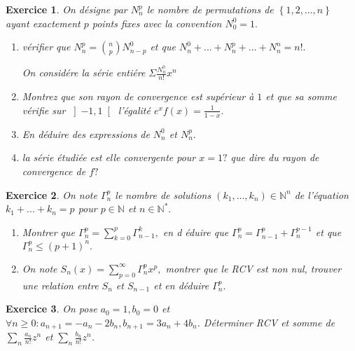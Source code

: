 \documentclass[12pt,a4paper]{article}
\theoremstyle{break}
\theoremstyle{break}
\newtheorem{Exo}{Exercice}
\begin{document}
 \begin{Exo}
 	On désigne par $N_{n}^{p}$ le nombre de permutations de $\left\{
1,2,...,n\right\} $ ayant exactement $p$ points fixes avec la convention $%
N_{0}^{0}=1.$

\begin{enumerate}
	\item vérifier que $N_{n}^{p}=\binom{n}{p}N_{n-p}^{0}$ et que $%
	N_{n}^{0}+...+N_{n}^{p}+...+N_{n}^{n}=n!.$
	
	On considére la série entiére $\Sigma \frac{N_{n}^{0}}{n!}x^{n}$
	
	\item Montrez que son rayon de convergence est supérieur \`{a} $1$ et
	que sa somme vérifie sur $\left] -1,1\right[ $ l'égalité $%
	e^{x}f(x)=\frac{1}{1-x}.$
	
	\item En déduire des expressions de $N_{n}^{0}$ et $N_{n}^{p}.$
	
	\item la série étudiée est elle convergente pour $x=1?$ que dire
	du rayon de convergence de $f?$
\end{enumerate}
 \end{Exo}

\begin{Exo}
	 On note $\Gamma _{n}^{p}$ le nombre de solutions $\left(
k_{1},...,k_{n}\right) \in \mathbb{N}^{n}$ de l'équation $%
k_{1}+...+k_{n}=p$ pour $p\in \mathbb{N}$ et $n\in \mathbb{N}^{*}.$

\begin{enumerate}
	\item Montrer que $\Gamma _{n}^{p}=\sum_{k=0}^{p}\Gamma _{n-1}^{k},$ en d%
	éduire que $\Gamma _{n}^{p}=\Gamma _{n-1}^{p}+\Gamma _{n}^{p-1}$ et que $%
	\Gamma _{n}^{p}\leq \left( p+1\right) ^{n}.$
	
	\item On note $S_{n}\left( x\right) =\sum_{p=0}^{\infty }\Gamma
	_{n}^{p}x^{p},$ montrer que le RCV est non nul, trouver une relation entre $%
	S_{n}$ et $S_{n-1}$ et en déduire $\Gamma _{n}^{p}.$
\end{enumerate}
\end{Exo}


\begin{Exo}
	 On pose $a_0=1,b_0=0$ et $\forall n\geqslant 0:a_{n+1}=-a_n-2b_n,b_{n+1}=3a_n+4b_n$. Déterminer RCV et somme de $\sum_n\frac{a_n}{n!}z^n$ et $\sum_n \frac{b_n}{n!}z^n$.	

\end{Exo}	
\end{document}
